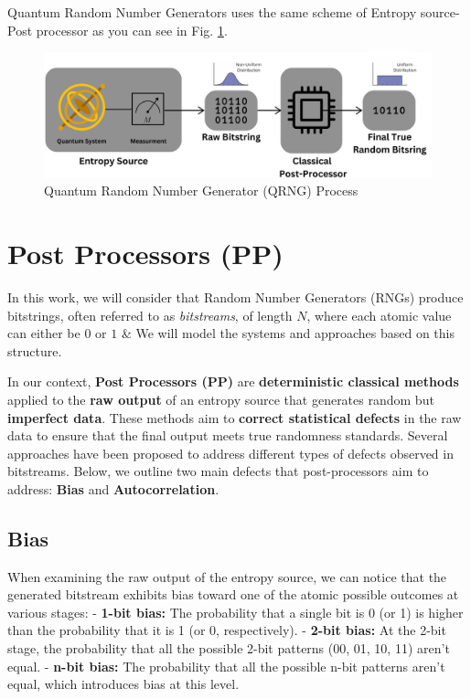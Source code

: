 Quantum Random Number Generators uses the same scheme of Entropy source-Post processor as you can see in Fig. \ref{fig:quanta}. 

\begin{figure}
\centering
\includegraphics[width=16.5cm]{figures/Quantum System.png}\vspace{-0.2cm}
\caption{Quantum Random Number Generator (QRNG) Process}
\label{fig:quanta}
\end{figure}

\section{Post Processors (PP)}
\noindent
\begin{tcolorbox}[colframe=blue!20!white, colback=yellow!10!white, coltitle=black, title=Note]
     In this work, we will consider that Random Number Generators (RNGs) produce bitstrings, often referred to as \textit{bitstreams}, of length \(N\), where each atomic value can either be \(0\) or \(1\) \& We will model the systems and approaches based on this structure.
\end{tcolorbox}

In our context, \textbf{Post Processors (PP)} are \textbf{deterministic classical methods} applied to the \textbf{raw output} of an entropy source that generates random but \textbf{imperfect data}. These methods aim to \textbf{correct statistical defects} in the raw data to ensure that the final output meets true randomness standards. Several approaches have been proposed to address different types of defects observed in bitstreams. Below, we outline two main defects that post-processors aim to address: \textbf{Bias} and \textbf{Autocorrelation}.

\subsection{Bias}  
When examining the raw output of the entropy source, we can notice that the generated bitstream exhibits bias toward one of the atomic possible outcomes at various stages:  
- \textbf{1-bit bias:} The probability that a single bit is 0 (or 1) is higher than the probability that it is 1 (or 0, respectively).  
- \textbf{2-bit bias:} At the 2-bit stage, the probability that all the possible 2-bit patterns (00, 01, 10, 11) aren't equal.  
- \textbf{n-bit bias:} The probability that all the possible n-bit patterns aren't equal, which introduces bias at this level.

